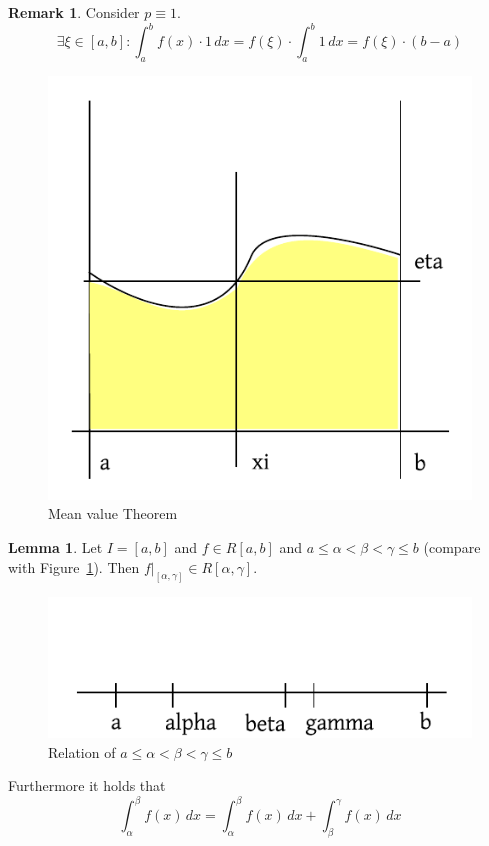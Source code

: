 \documentclass[a4paper,landscape,twocolumn]{article}
\theoremstyle{definition}
\newtheorem{rem}{Remark}
\newtheorem{lemma}{Lemma}
\begin{document}
\begin{rem}
  Consider $p \equiv 1$.
  \[ \exists \xi \in [a,b]: \int_a^b f(x) \cdot 1 \, dx = f(\xi) \cdot \int_a^b 1 \, dx = f(\xi) \cdot (b-a) \]
  \begin{figure}[!h]
    \begin{center}
      \includegraphics{img/mean_value_theorem.pdf}
      \caption{Mean value Theorem}
    \end{center}
  \end{figure}
\end{rem}

\begin{lemma}
  Let $I = [a,b]$ and $f \in R[a,b]$ and $a \leq \alpha < \beta < \gamma \leq b$ (compare with Figure~\ref{img:nl}).
  Then $f |_{[\alpha,\gamma]} \in R[\alpha,\gamma]$.

  \begin{figure}[!h]
    \begin{center}
      \includegraphics{img/number_line.pdf}
      \caption{Relation of $a \leq \alpha < \beta < \gamma \leq b$}
      \label{img:nl}
    \end{center}
  \end{figure}

  Furthermore it holds that
  \[ \int_{\alpha}^\beta f(x) \, dx = \int_\alpha^\beta f(x) \, dx + \int_\beta^\gamma f(x) \, dx \]
\end{lemma}
\end{document}
